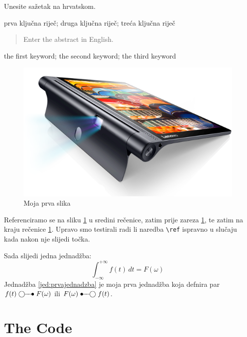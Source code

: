 \documentclass[zavrsnirad]{fer}
\begin{document}

\begin{sazetak}
  Unesite sažetak na hrvatskom.

  \blindtext
\end{sazetak}

\begin{kljucnerijeci}
  prva ključna riječ; druga ključna riječ; treća ključna riječ
\end{kljucnerijeci}


\begin{abstract}
  Enter the abstract in English.
  
  \blindtext 
\end{abstract}

\begin{keywords}
  the first keyword; the second keyword; the third keyword
\end{keywords}


\begin{figure}[htb]
  \centering
  \includegraphics[width=0.38\linewidth]{Figures/lenovo_yoga_tab3_pro_front.png} 
  \caption{Moja prva slika}
  \label{slk:prvaslika}
\end{figure}

Referenciramo se na sliku \ref{slk:prvaslika} u sredini rečenice, zatim prije zareza \ref{slk:prvaslika}, te zatim na kraju rečenice \ref{slk:prvaslika}.
Upravo smo testirali radi li naredba \verb|\ref| ispravno u slučaju kada nakon nje slijedi točka.

Sada slijedi jedna jednadžba:
\begin{equation}
  \label{jed:prvajednadzba}
  \int_{-\infty}^{+\infty}f(t)\,dt=F(\omega)
\end{equation}
Jednadžba \eqref{jed:prvajednadzba} je moja prva jednadžba koja defnira par $f(t)\ufrek F(\omega)$ ili $F(\omega)\uvrem f(t)$.


\backmatter

\chapter{The Code}

\Blindtext
\end{document}
